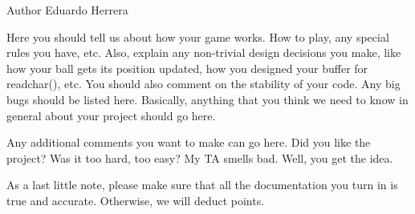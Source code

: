 \begin{DoxyAuthor}{Author}
Eduardo Herrera
\end{DoxyAuthor}
Here you should tell us about how your game works. How to play, any special rules you have, etc. Also, explain any non-\/trivial design decisions you make, like how your ball gets its position updated, how you designed your buffer for readchar(), etc. You should also comment on the stability of your code. Any big bugs should be listed here. Basically, anything that you think we need to know in general about your project should go here.

Any additional comments you want to make can go here. Did you like the project? Was it too hard, too easy? My TA smells bad. Well, you get the idea.

As a last little note, please make sure that all the documentation you turn in is true and accurate. Otherwise, we will deduct points. 